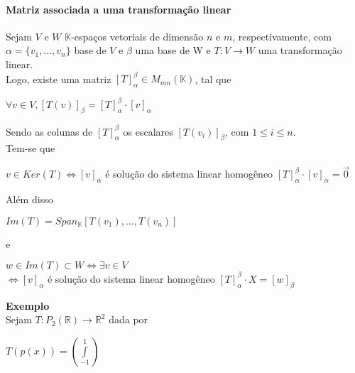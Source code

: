 \documentclass[12pt]{article}
\begin{document}
\paragraph{Matriz associada a uma transformação linear\\}
	Sejam $V$ e $W$ $\mathbb{K}$-espaços vetoriais de dimensão $n$ e $m$, respectivamente, com $\alpha = \lbrace v_1, \dots, v_n \rbrace$ base de $V$ e $\beta$ uma base de W e $T: V \rightarrow W$ uma transformação linear.\\
	Logo, existe uma matriz $[T]^\beta_\alpha \in M_{mn}(\mathbb{K})$, tal que
	\begin{center}
		$\forall v \in V, [T(v)]_\beta = [T]^\beta_\alpha \cdot [v]_\alpha$
	\end{center}
	Sendo as colunas de $[T]^\beta_\alpha$ os escalares $[T(v_i)]_\beta$, com $1 \leq i \leq n$.\\[10pt]
	Tem-se que
	\begin{center}
		$v \in Ker(T) \Leftrightarrow [v]_\alpha$ é solução do sistema linear homogêneo $[T]^\beta_\alpha \cdot [v]_\alpha = \overrightarrow{0}$
	\end{center}
	Além disso
	\begin{center}
		$Im(T) = Span_\mathbb{K}\left[ T(v_1), \dots, T(v_n)\right]$
	\end{center}
	e \begin{center}
		$w \in Im(T) \subset W \Leftrightarrow \exists v \in V$\\
		$\Leftrightarrow [v]_\alpha$ é solução do sistema linear homogêneo $[T]^\beta_\alpha \cdot X = [w]_\beta$
	\end{center}
	\textbf{Exemplo\\}
	Sejam $T: P_2(\mathbb{R}) \rightarrow \mathbb{R}^2$ dada por
	\begin{center}
		$T(p(x)) = \left( \int\limits_{-1}^1 \right)$
	\end{center}
\end{document}
